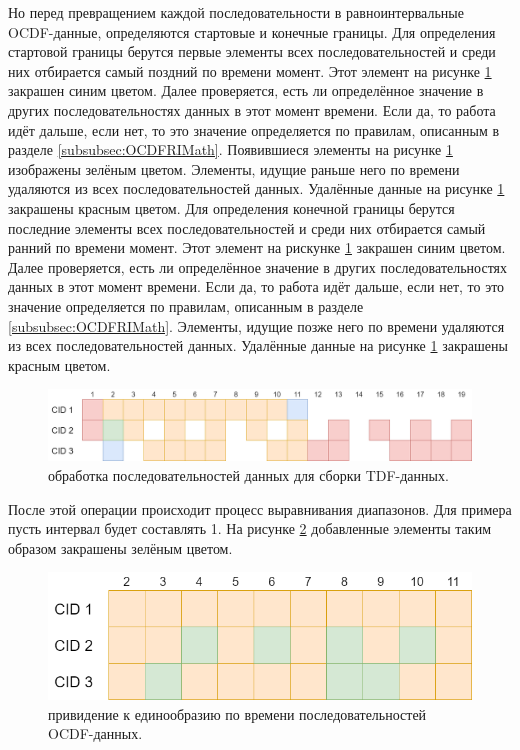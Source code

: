 {  \par Но перед превращением каждой последовательности в равноинтервальные OCDF-данные, определяются стартовые и конечные границы. Для определения стартовой границы берутся первые элементы всех последовательностей и среди них отбирается самый поздний по времени момент. Этот элемент на рисунке \ref{fig:CreateTDFstage2} закрашен синим цветом. Далее проверяется, есть ли определённое значение в других последовательностях данных в этот момент времени. Если да, то работа идёт дальше, если нет, то это значение определяется по правилам, описанным в разделе \ref{subsubsec:OCDFRIMath}. Появившиеся элементы на рисунке \ref{fig:CreateTDFstage2} изображены зелёным цветом. Элементы, идущие раньше него по времени удаляются из всех последовательностей данных. Удалённые данные на рисунке \ref{fig:CreateTDFstage2} закрашены красным цветом. Для определения конечной границы берутся последние элементы всех последовательностей и среди них отбирается самый ранний по времени момент. Этот элемент на рискунке \ref{fig:CreateTDFstage2} закрашен синим цветом. Далее проверяется, есть ли определённое значение в других последовательностях данных в этот момент времени. Если да, то работа идёт дальше, если нет, то это значение определяется по правилам, описанным в разделе \ref{subsubsec:OCDFRIMath}. Элементы, идущие позже него по времени удаляются из всех последовательностей данных. Удалённые данные на рисунке \ref{fig:CreateTDFstage2} закрашены красным цветом.

  \begin{figure}[H]
    \centering
    \includegraphics[width=\textwidth]{images/forDataManipulator/CreateTDFstage2.drawio.png}
    \caption{обработка последовательностей данных для сборки TDF-данных.} 
    \label{fig:CreateTDFstage2}
  \end{figure}

  \par После этой операции происходит процесс выравнивания диапазонов. Для примера пусть интервал будет составлять 1. На рисунке \ref{fig:CreateTDFstage3} добавленные элементы таким образом закрашены зелёным цветом. 

  \begin{figure}[H]
    \centering
    \includegraphics[width=\textwidth]{images/forDataManipulator/CreateTDFstage3.drawio.png}
    \caption{привидение к единообразию по времени последовательностей OCDF-данных.} 
    \label{fig:CreateTDFstage3}
  \end{figure}

}
